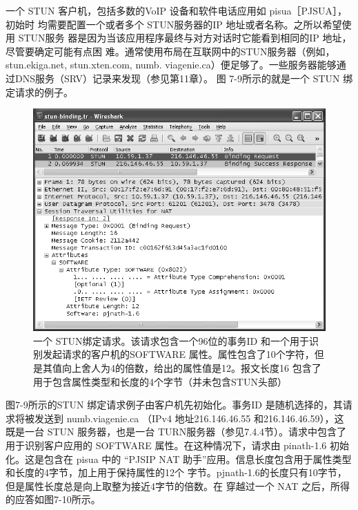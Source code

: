 一个 STUN 客户机，包括多数的VoIP 设备和软件电话应用如 pisua［PJSUA］，初始时
均需要配置一个或者多个 STUN服务器的IP 地址或者名称。之所以希望使用 STUN服务
器是因为当该应用程序最终与对方对话时它能看到相同的IP 地址，尽管要确定可能有点困
难。通常使用布局在互联网中的STUN服务器（例如，stun.ekiga.net, stun.xten.com, numb.
viagenie.ca）便足够了。一些服务器能够通过DNS服务（SRV）记录来发现（参见第11章）。
图 7-9所示的就是一个 STUN 绑定请求的例子。

\begin{figure}[H]
  \centering
  \includegraphics[scale=0.7]{imgs/7/7-9.png}
  \caption{一个 STUN绑定请求。该请求包含一个96位的事务ID 和一个用于识别发起请求的客户机的SOFTWARE
  属性。属性包含了10个字符，但是其值向上舍人为4的倍数，给出的属性值是12。报文长度16 包含了用于包含属性类型和长度的4个字节（并未包含STUN头部）}
\end{figure}

图7-9所示的STUN 绑定请求例子由客户机先初始化。事务ID 是随机选择的，其请
求将被发送到 numb.viagenie.ca （IPv4 地址216.146.46.55 和216.146.46.59），这既是一台
STUN 服务器，也是一台 TURN服务器（参见7.4.4节）。请求中包含了用于识别客户应用的
SOFTWARE 属性。在这种情况下，请求由 pinath-1.6 初始化。这是包含在 pisua 中的 “PJSIP
NAT 助手”应用。信息长度包含用于属性类型和长度的4字节，加上用于保持属性的12个
字节。pjnath-1.6的长度只有10字节，但是属性长度总是向上取整为接近4字节的倍数。在
穿越过一个 NAT 之后，所得的应答如图7-10所示。

